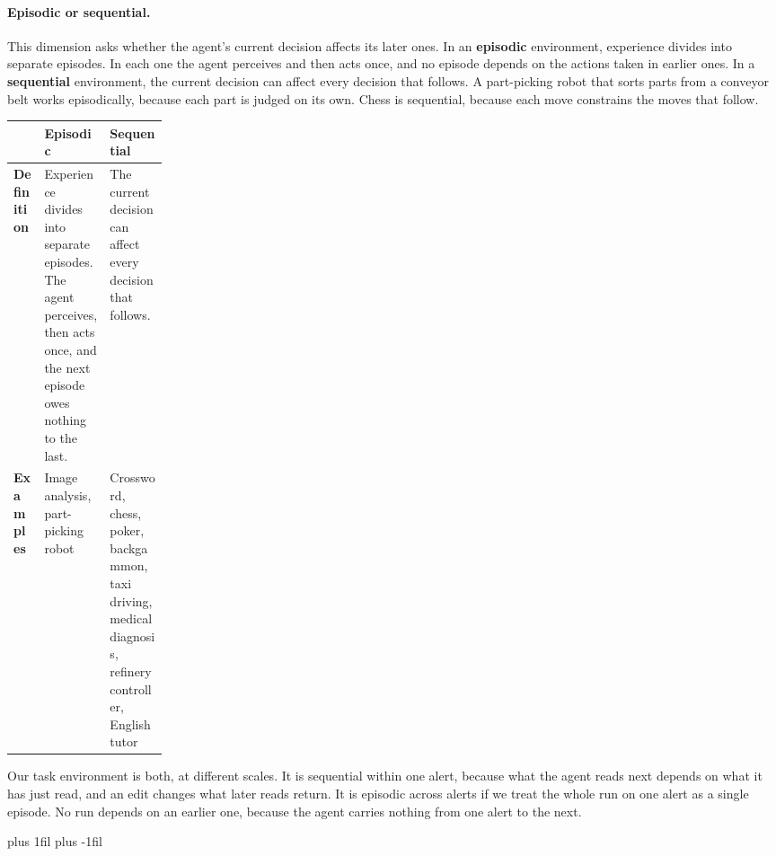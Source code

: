 \paragraph{Episodic or sequential.}\leavevmode\par\nopagebreak
This dimension asks whether the agent's current decision affects its later ones. In an
\textbf{episodic} environment, experience divides into separate episodes. In each one the agent
perceives and then acts once, and no episode depends on the actions taken in earlier ones. In a
\textbf{sequential} environment, the current decision can affect every decision that follows. A
part-picking robot that sorts parts from a conveyor belt works episodically, because each part is
judged on its own. Chess is sequential, because each move constrains the moves that follow.
\par\nopagebreak\smallskip
\noindent\begin{adjustbox}{width=\linewidth}\begin{tabularx}{\linewidth}{L{0.2\linewidth}XX}
  \toprule
  & \textbf{Episodic} & \textbf{Sequential} \\
  \midrule
  \textbf{Definition} & Experience divides into separate episodes. The agent perceives, then acts
  once, and the next episode owes nothing to the last. & The current decision can affect every
  decision that follows. \\
  \textbf{Examples} & Image analysis, part-picking robot & Crossword, chess, poker, backgammon, taxi
  driving, medical diagnosis, refinery controller, English tutor \\
  \bottomrule
\end{tabularx}\end{adjustbox}\par
Our task environment is both, at different scales. It is sequential within one alert, because what
the agent reads next depends on what it has just read, and an edit changes what later reads return.
It is episodic across alerts if we treat the whole run on one alert as a single episode. No run
depends on an earlier one, because the agent carries nothing from one alert to the next.

\par\vskip 0pt plus 1fil\vskip 0pt plus -1fil\relax
